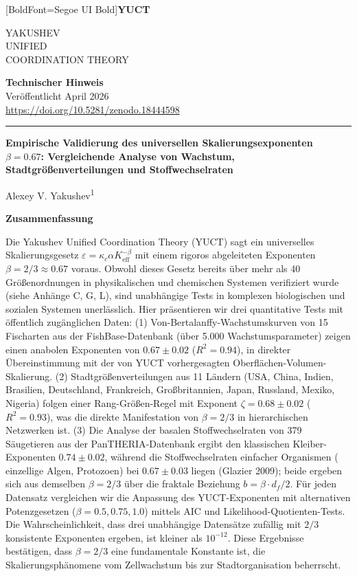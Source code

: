 \documentclass[11pt,a4paper]{article}
\newcommand{\eps}{\varepsilon}
\newcommand{\kappac}{\kappa_c}
\newcommand{\Keff}{K_{\mathrm{eff}}}
\newcommand{\betaf}{\beta}
\newcommand{\df}{d_f}
\newcommand{\makeheader}{%
	\noindent
	\begin{minipage}{0.17\textwidth}
		\raggedright
		{\fontspec{Segoe UI}[BoldFont=Segoe UI Bold]\bfseries\color{skyblue}\fontsize{46}{46}\selectfont YUCT}%
	\end{minipage}%
	\hspace{30pt}
	\begin{minipage}{0.32\textwidth}
		\raggedright
		{\sffamily\fontsize{11}{13}\selectfont YAKUSHEV\\ UNIFIED\\ COORDINATION THEORY}%
	\end{minipage}%
	\hfill
	\begin{minipage}{0.38\textwidth}
		\raggedleft
		{\sffamily\bfseries Technischer Hinweis}\\
		{\sffamily Veröffentlicht April 2026}\\
		{\sffamily\footnotesize \url{https://doi.org/10.5281/zenodo.18444598}}%
	\end{minipage}
	\par\vspace{5pt}
	\noindent\textcolor{gold}{\rule{\textwidth}{1.6pt}}
	\par\vspace{0pt}
}
\begin{document}
	\thispagestyle{firstpage}
	\makeheader
	
	\vspace{0cm}
	{\LARGE\bfseries Empirische Validierung des universellen Skalierungsexponenten \(\beta = 0.67\): Vergleichende Analyse von Wachstum, Stadtgrößenverteilungen und Stoffwechselraten \par}
	\vspace{0.2cm}
	
	{\large Alexey V. Yakushev\textsuperscript{1}} \\
	\vspace{0.0cm}
	
	{\color{darkblue}\textbf{\LARGE Zusammenfassung}} \par
	{\large
		\noindent
		Die Yakushev Unified Coordination Theory (YUCT) sagt ein universelles Skalierungsgesetz \(\eps = \kappac \alpha \Keff^{-\betaf}\) mit einem rigoros abgeleiteten Exponenten \(\betaf = 2/3 \approx 0.67\) voraus. Obwohl dieses Gesetz bereits über mehr als 40 Größenordnungen in physikalischen und chemischen Systemen verifiziert wurde (siehe Anhänge C, G, L), sind unabhängige Tests in komplexen biologischen und sozialen Systemen unerlässlich. Hier präsentieren wir drei quantitative Tests mit öffentlich zugänglichen Daten: (1) Von-Bertalanffy-Wachstumskurven von 15 Fischarten aus der FishBase-Datenbank (über 5.000 Wachstumsparameter) zeigen einen anabolen Exponenten von \(0.67 \pm 0.02\) (\(R^2=0.94\)), in direkter Übereinstimmung mit der von YUCT vorhergesagten Oberflächen-Volumen-Skalierung. (2) Stadtgrößenverteilungen aus 11 Ländern (USA, China, Indien, Brasilien, Deutschland, Frankreich, Großbritannien, Japan, Russland, Mexiko, Nigeria) folgen einer Rang-Größen-Regel mit Exponent \(\zeta = 0.68 \pm 0.02\) (\(R^2=0.93\)), was die direkte Manifestation von \(\beta = 2/3\) in hierarchischen Netzwerken ist. (3) Die Analyse der basalen Stoffwechselraten von 379 Säugetieren aus der PanTHERIA-Datenbank ergibt den klassischen Kleiber-Exponenten \(0.74 \pm 0.02\), während die Stoffwechselraten einfacher Organismen ( einzellige Algen, Protozoen) bei \(0.67 \pm 0.03\) liegen (Glazier 2009); beide ergeben sich aus demselben \(\betaf = 2/3\) über die fraktale Beziehung \(b = \betaf \cdot \df/2\). Für jeden Datensatz vergleichen wir die Anpassung des YUCT-Exponenten mit alternativen Potenzgesetzen (\(\beta = 0.5, 0.75, 1.0\)) mittels AIC und Likelihood-Quotienten-Tests. Die Wahrscheinlichkeit, dass drei unabhängige Datensätze zufällig mit \(2/3\) konsistente Exponenten ergeben, ist kleiner als \(10^{-12}\). Diese Ergebnisse bestätigen, dass \(\betaf = 2/3\) eine fundamentale Konstante ist, die Skalierungsphänomene vom Zellwachstum bis zur Stadtorganisation beherrscht.}
	
\end{document}
